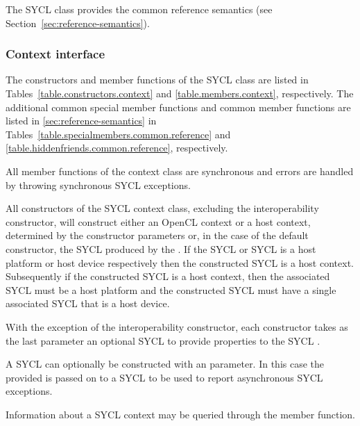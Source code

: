 The SYCL  class provides the common reference semantics
(see Section~\ref{sec:reference-semantics}).


\subsubsection{Context interface}

The constructors and member functions of the SYCL  class are listed in Tables~\ref{table.constructors.context} and \ref{table.members.context}, respectively. The additional common special member functions and common member functions are listed in \ref{sec:reference-semantics} in Tables~\ref{table.specialmembers.common.reference} and \ref{table.hiddenfriends.common.reference}, respectively.

All member functions of the \gls{context} class are synchronous and errors are handled by throwing synchronous SYCL exceptions.

All constructors of the SYCL \gls{context} class, excluding the interoperability constructor, will construct either an OpenCL context or a host context, determined by the constructor parameters or, in the case of the default constructor, the SYCL  produced by the . If the SYCL  or SYCL  is a host platform or host device respectively then the constructed SYCL  is a host context. Subsequently if the constructed SYCL  is a host context, then the associated SYCL  must be a host platform and the constructed SYCL  must have a single associated SYCL  that is a host device.

With the exception of the interoperability constructor, each constructor takes as the last
parameter an optional SYCL  to provide properties to
the SYCL .

A SYCL  can optionally be constructed with an  parameter. In this case the  provided is passed on to a SYCL  to be used to report asynchronous SYCL exceptions.

Information about a SYCL \gls{context} may be queried through the 
member function.

